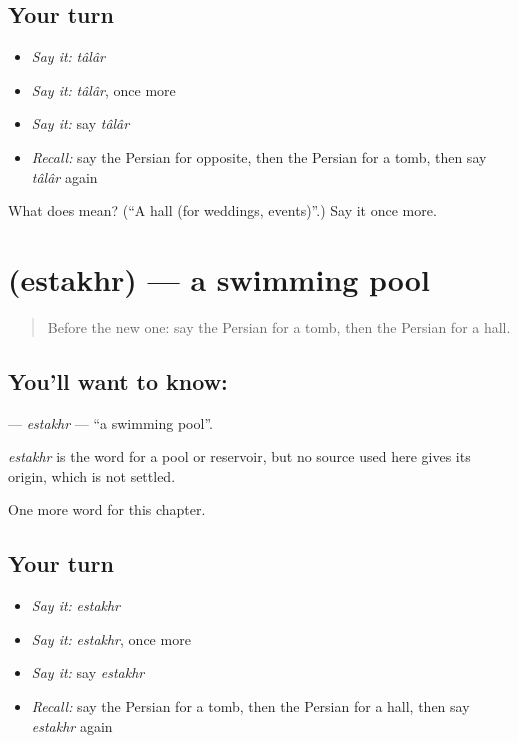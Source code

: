 \subsection*{Your turn}
\begin{itemize}
\raggedright
  \item \emph{Say it:} \emph{tâlâr}
  \item \emph{Say it:} \emph{tâlâr}, once more
  \item \emph{Say it:} say \emph{tâlâr}
  \item \emph{Recall:} say the Persian for opposite, then the Persian for a tomb, then say \emph{tâlâr} again
\end{itemize}

\begin{tcolorbox}[breakable,colback=teal!4,colframe=teal!35!black,title={Before you move on}]
What does  mean? (\textquotedblleft{}A hall (for weddings, events)\textquotedblright{}.) Say it once more.
\end{tcolorbox}
\section[\texorpdfstring{\fa{استخر} (estakhr)}{استخر (estakhr)}]{ (estakhr) — a swimming pool}

\label{lesson:FA-C231-estakhr}



\begin{quote}
Before the new one: say the Persian for a tomb, then the Persian for a hall.
\end{quote}

\subsection*{You'll want to know: }
\textbf{} — \emph{estakhr} — \textquotedblleft{}a swimming pool\textquotedblright{}.

\begin{cousinweb}
\emph{estakhr} is the word for a pool or reservoir, but no source used here gives its origin, which is not settled.
\end{cousinweb}

\begin{grammarlens}[title={What you've built}]
One more word for this chapter.
\end{grammarlens}

\subsection*{Your turn}
\begin{itemize}
\raggedright
  \item \emph{Say it:} \emph{estakhr}
  \item \emph{Say it:} \emph{estakhr}, once more
  \item \emph{Say it:} say \emph{estakhr}
  \item \emph{Recall:} say the Persian for a tomb, then the Persian for a hall, then say \emph{estakhr} again
\end{itemize}

